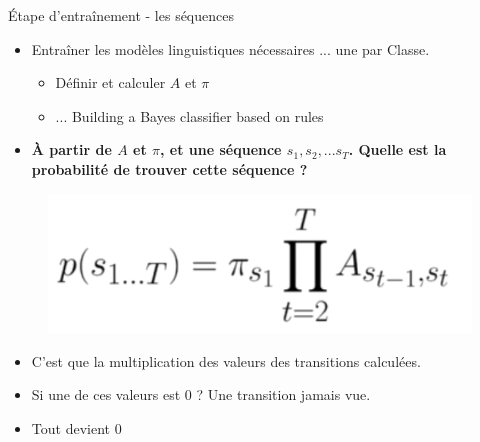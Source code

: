\documentclass[aspectratio=169,xcolor=dvipsnames, t]{beamer}
\begin{document}
\begin{frame}{Étape d'entraînement - les séquences}
	\begin{itemize}
		\item Entraîner les modèles linguistiques nécessaires ... une par Classe.
		\begin{itemize}
			\item Définir et calculer $A$ et $\pi$ 
			\item ... Building a Bayes classifier based on rules
		\end{itemize}
		\item \textbf{ À partir de $A$ et $\pi$, et une séquence ${s_1,s_2,...s_T}$. Quelle est la probabilité de trouver cette séquence ?}
	\end{itemize}
	
	\begin{figure}
		\includegraphics[height=0.2\paperheight]{figures/eqSeqMult.png}
	\end{figure}
	
	\begin{itemize}
		\item C'est que la multiplication des valeurs des transitions calculées.
		\item Si une de ces valeurs est $0$ ? Une transition jamais vue.
		\item Tout devient $0$
	\end{itemize}
	
\end{frame}
\end{document}
